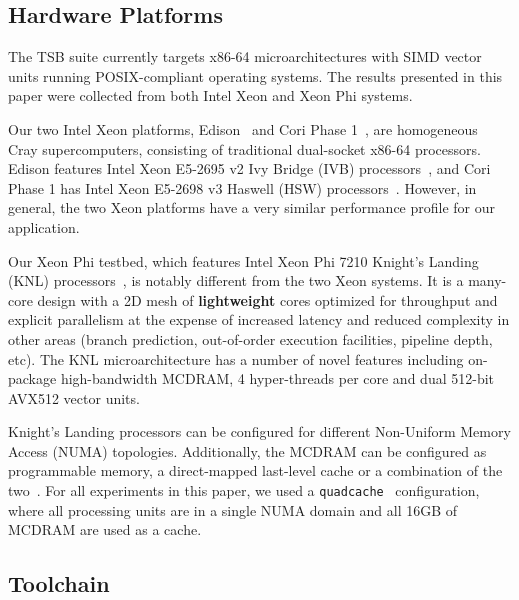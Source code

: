 \documentclass{sig-alternate}
\begin{document}
\subsection{Hardware Platforms}
\label{sec:setup:hardware_platforms}

The TSB suite currently targets x86-64 microarchitectures with SIMD vector units
  running POSIX-compliant operating systems.
The results presented in this paper were collected from both Intel Xeon and
  Xeon Phi systems.

Our two Intel Xeon platforms, Edison~\cite{nersc_edison_config} and Cori Phase
  1~\cite{nersc_cori_p1_config}, are homogeneous Cray supercomputers,
  consisting of traditional dual-socket x86-64 processors.
Edison features Intel Xeon E5-2695 v2 Ivy Bridge
  (IVB) processors~\cite{intel_ark_xeon_e5_2695_v2}, and Cori Phase 1 has Intel
  Xeon E5-2698 v3 Haswell (HSW) processors~\cite{intel_ark_xeon_e5_2698_v3}.
However, in general, the two Xeon platforms have a very similar performance
  profile for our application.

Our Xeon Phi testbed, which features Intel Xeon Phi 7210 Knight's Landing
  (KNL) processors~\cite{intel_ark_xeon_phi_7210}, is notably different from
  the two Xeon systems.
It is a many-core design with a 2D mesh of \textbf{lightweight} cores optimized
  for throughput and explicit parallelism at the expense of increased latency
  and reduced complexity in other areas (branch prediction, out-of-order
  execution facilities, pipeline depth, etc).
The KNL microarchitecture has a number of novel features including on-package
  high-bandwidth MCDRAM, 4 hyper-threads per core and dual 512-bit
  AVX512 vector units.~\cite{roofline_knl,knl_sodani}

Knight's Landing processors can be configured for different Non-Uniform Memory
  Access (NUMA) topologies.
Additionally, the MCDRAM can be configured as programmable memory, a
  direct-mapped last-level cache or a combination of the
  two~\cite{knl_sodani}.
For all experiments in this paper, we used a
  \lstinline{quadcache}~\cite{roofline_knl} configuration, where all processing
  units are in a single NUMA domain and all 16GB of MCDRAM are used as a cache.

\subsection{Toolchain}
\label{sec:setup:toolchain}
\end{document}
